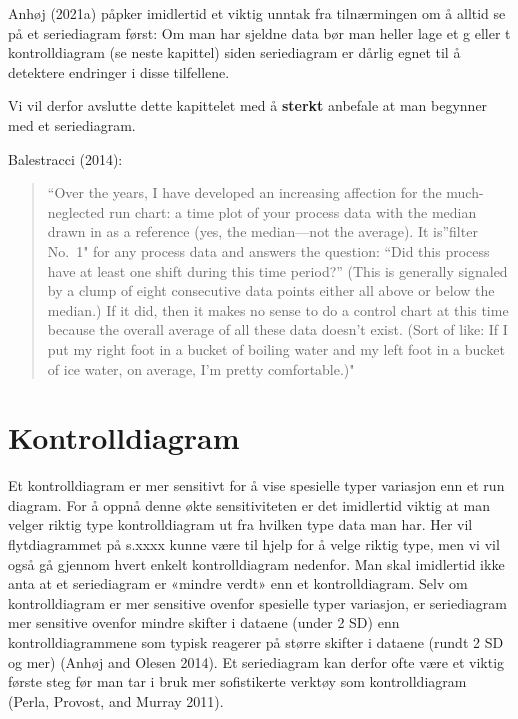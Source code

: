 \documentclass[
]{book}
\begin{document}
Anhøj (2021a) påpker imidlertid et viktig unntak fra tilnærmingen om å alltid se på et seriediagram først: Om man har sjeldne data bør man heller lage et g eller t kontrolldiagram (se neste kapittel) siden seriediagram er dårlig egnet til å detektere endringer i disse tilfellene.

Vi vil derfor avslutte dette kapittelet med å \textbf{sterkt} anbefale at man begynner med et seriediagram.

Balestracci (2014):

\begin{quote}
``Over the years, I have developed an increasing affection for the much-neglected run chart: a time plot of your process data with the median drawn in as a reference (yes, the median---not the average). It is''filter No.~1" for any process data and answers the question: ``Did this process have at least one shift during this time period?'' (This is generally signaled by a clump of eight consecutive data points either all above or below the median.)
If it did, then it makes no sense to do a control chart at this time because the overall average of all these data doesn't exist. (Sort of like: If I put my right foot in a bucket of boiling water and my left foot in a bucket of ice water, on average, I'm pretty comfortable.)"
\end{quote}

\hypertarget{kontrolldiagram}{%
\chapter{Kontrolldiagram}\label{kontrolldiagram}}

Et kontrolldiagram er mer sensitivt for å vise spesielle typer variasjon enn et run diagram. For å oppnå denne økte sensitiviteten er det imidlertid viktig at man velger riktig type kontrolldiagram ut fra hvilken type data man har. Her vil flytdiagrammet på s.xxxx kunne være til hjelp for å velge riktig type, men vi vil også gå gjennom hvert enkelt kontrolldiagram nedenfor. Man skal imidlertid ikke anta at et seriediagram er «mindre verdt» enn et kontrolldiagram. Selv om kontrolldiagram er mer sensitive ovenfor spesielle typer variasjon, er seriediagram mer sensitive ovenfor mindre skifter i dataene (under 2 SD) enn kontrolldiagrammene som typisk reagerer på større skifter i dataene (rundt 2 SD og mer) (Anhøj and Olesen 2014). Et seriediagram kan derfor ofte være et viktig første steg før man tar i bruk mer sofistikerte verktøy som kontrolldiagram (Perla, Provost, and Murray 2011).
\end{document}
